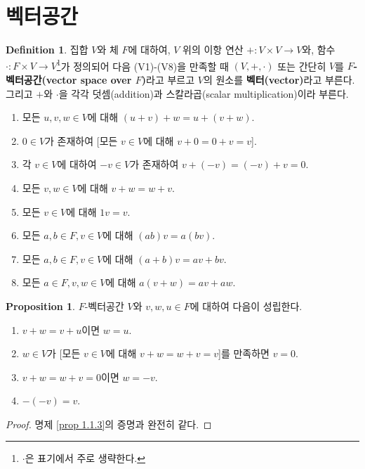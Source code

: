 \documentclass[11pt]{book}
\numberwithin{equation}{chapter}
\theoremstyle{definition}
\newtheorem{prop}[thm]{Proposition}
\newtheorem{defn}[thm]{Definition}
\begin{document}
\section{벡터공간}
\begin{defn}
    집합 \(V\)와 체 \(F\)에 대하여, \(V\) 위의 이항 연산 \(+ : V \times V \to V\)와, 함수 \(\cdot : F \times V \to V\)\footnote{\(\cdot\)은 표기에서 주로 생략한다.}가 정의되어 다음 (V1)-(V8)을 만족할 때 \((V, +, \cdot)\) 또는 간단히 \(V\)를 \textbf{\(F\)-벡터공간(vector space over \(F\))}라고 부르고 \(V\)의 원소를 \textbf{벡터(vector)}라고 부른다. 그리고 \(+\)와 \(\cdot\)을 각각 덧셈(addition)과 스칼라곱(scalar multiplication)이라 부른다.
    \begin{enumerate}[label=(VS\arabic*), leftmargin=2\parindent]
        \item
        모든 \(u, v, w \in V\)에 대해 \((u+v)+w=u+(v+w)\).
        \item
        \(0 \in V\)가 존재하여 [모든 \(v \in V\)에 대해 \(v+0=0+v=v\)].
        \item
        각 \(v \in V\)에 대하여 \(-v \in V\)가 존재하여 \(v+(-v)=(-v)+v=0\).
        \item
        모든 \(v, w \in V\)에 대해 \(v+w=w+v\).
        \item
        모든 \(v \in V\)에 대해 \(1v = v\).
        \item
        모든 \(a, b \in F, v \in V\)에 대해 \((ab)v = a(bv)\).
        \item
        모든 \(a, b \in F, v \in V\)에 대해 \((a+b)v=av+bv\).
        \item
        모든 \(a \in F, v, w \in V\)에 대해 \(a(v+w) = av + aw\).
    \end{enumerate}
\end{defn}

\begin{prop} \label{prop 3.1.2}
    \(F\)-벡터공간 \(V\)와 \(v, w, u \in F\)에 대하여 다음이 성립한다.
    \begin{enumerate} [label=(\alph*), leftmargin=2\parindent]
        \item \(v+w = v+u\)이면 \(w = u\).
        \item \(w \in V\)가 [모든 \( v \in V\)에 대해 \(v+w = w+v = v\)]를 만족하면 \(v = 0\).
        \item \(v+w = w+v = 0\)이면 \(w = -v\).
        \item \(-(-v) = v\).
    \end{enumerate}
\end{prop}
\begin{proof}
    명제 \ref{prop 1.1.3}의 증명과 완전히 같다.
\end{proof}
\end{document}
